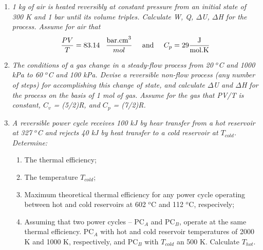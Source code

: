 \begin{enumerate}
\item {\it 1 kg of air is heated reversibly at constant pressure from an initial state of 300 K and 1 bar until its volume triples. Calculate W, Q, $\Delta$U, $\Delta$H for the process. Assume for air that
\begin{displaymath}
\displaystyle\frac{PV}{T} = 83.14 \;\;\; \displaystyle\frac{\text{bar.cm}^{3}}{mol}\;\;\;\;\;\text{and}\;\;\;\;\;C_{p}=29\displaystyle\frac{\text{J}}{\text{mol.K}}
\end{displaymath}
}

\item  {\it The conditions of a gas change in a steady-flow process from 20 $^{o}$C and 1000 kPa to 60 $^{o}$C and 100 kPa. Devise a reversible non-flow process (any number of steps) for accomplishing this change of state, and calculate $\Delta$U and $\Delta$H for the process on the basis of 1 mol of gas. Assume for the gas that PV/T is constant, $C_{v}$ = (5/2)R, and $C_{p}$ = (7/2)R.}

\item {\it A reversible power cycle receives 100 kJ by hear transfer from a hot reservoir at 327 $^{o}$C and rejects 40 kJ by heat transfer to a cold reservoir at $T_{cold}$. Determine:
\begin{enumerate}
\item The thermal efficiency;
\item The temperature $T_{cold}$;
\item Maximum theoretical thermal efficiency for any power cycle operating between hot and cold reservoirs at 602 $^{o}$C and 112 $^{o}$C, respecively;
\item Assuming that two power cycles -- PC$_{A}$ and PC$_{B}$, operate at the same thermal efficiency. PC$_{A}$ with hot and cold reservoir temperatures of 2000 K and 1000 K, respectively, and PC$_{B}$ with $T_{cold}$ an 500 K. Calculate $T_{hot}$.
\end{enumerate}
}


\end{enumerate}

